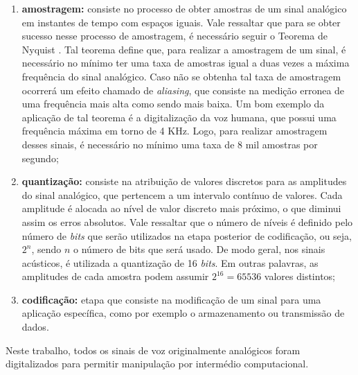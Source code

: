 \documentclass[a4paper,12pt,twoside,openright]{report}
\begin{document}
\begin{enumerate}
\item{} \textbf{amostragem:} consiste no processo de obter amostras de um sinal anal\'{o}gico em instantes de tempo com espa{\c c}os iguais. Vale ressaltar que para se obter sucesso nesse processo de amostragem, \'{e} necess\'{a}rio seguir o Teorema de Nyquist \cite{deng}. Tal teorema define que, para realizar a amostragem de um sinal, \'{e} necess\'{a}rio no m\'{i}nimo ter uma taxa de amostras igual a duas vezes a m\'{a}xima frequ\^{e}ncia do sinal anal\'{o}gico. Caso n\~{a}o se obtenha tal taxa de amostragem ocorrer\'{a} um efeito chamado de \textit{aliasing}, que consiste na medi{\c c}\~{a}o erronea de uma frequ\^{e}ncia mais alta como sendo mais baixa. Um bom exemplo da aplica{\c c}\~{a}o de tal teorema \'{e} a digitaliza{\c c}\~{a}o da voz humana, que possui uma frequ\^{e}ncia m\'{a}xima em torno de 4 KHz. Logo, para realizar amostragem desses sinais, \'{e} necess\'{a}rio no m\'{i}nimo uma taxa de 8 mil amostras por segundo;
\item{} \textbf{quantiza{\c c}\~{a}o:} consiste na atribui{\c c}\~{a}o de valores discretos para as amplitudes do sinal anal\'{o}gico, que pertencem a um intervalo cont\'{i}nuo de valores. Cada amplitude \'{e} alocada ao n\'{i}vel de valor discreto mais pr\'{o}ximo, o que diminui assim os erros absolutos. Vale ressaltar que o n\'{u}mero de n\'{i}veis \'{e} definido pelo n\'{u}mero de \textit{bits} que ser\~{a}o utilizados na etapa posterior de codifica{\c c}\~{a}o, ou seja, ${2^n}$, sendo ${n}$ o n\'{u}mero de bits que ser\'{a} usado. De modo geral, nos sinais ac\'{u}sticos, \'{e} utilizada a quantiza{\c c}\~{a}o de 16 \textit{bits}. Em outras palavras, as amplitudes de cada amostra podem assumir ${2^{16}} = 65536$ valores distintos; 
\item{}	\textbf{codifica{\c c}\~{a}o:} etapa que consiste na modifica{\c c}\~{a}o de um sinal para uma aplica{\c c}\~{a}o espec\'{i}fica, como por exemplo o armazenamento ou transmiss\~{a}o de dados.
\end{enumerate}
\par Neste trabalho, todos os sinais de voz originalmente anal\'{o}gicos foram digitalizados para permitir manipula\c{c}\~{a}o por interm\'{e}dio computacional.  
\end{document}
